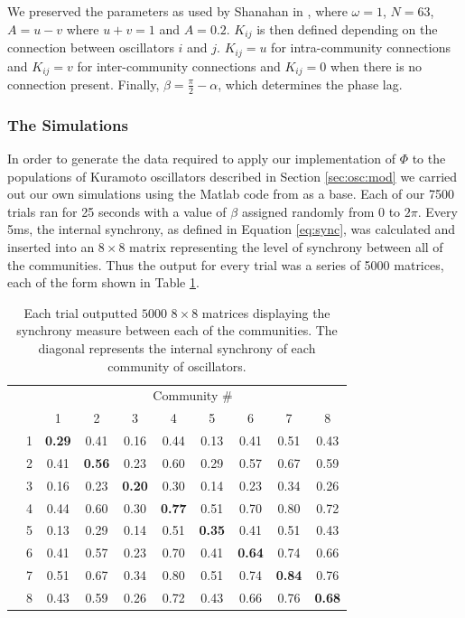 \documentclass[a4paper,11pt]{article}
\begin{document}
We preserved the parameters as used by Shanahan in \cite{Shanahan2010}, where $\omega = 1$, $N = 63$, $A = u - v$ where $u + v = 1$ and $A = 0.2$. $K_{ij}$ is then defined depending on the connection between oscillators $i$ and $j$. $K_{ij} = u$ for intra-community connections and $K_{ij} = v$ for inter-community connections and $K_{ij} = 0$ when there is no connection present. Finally, $\beta = \frac{\pi}{2} - \alpha$, which determines the phase lag.

\subsubsection{The Simulations}
\label{sec:osc:sims}

In order to generate the data required to apply our implementation of $\Phi$ to the populations of Kuramoto oscillators described in Section \ref{sec:osc:mod} we carried out our own simulations using the Matlab code from \cite{Shanahan2010} as a base. Each of our 7500 trials ran for 25 seconds with a value of $\beta$ assigned randomly from $0$ to $2\pi$. Every 5ms, the internal synchrony, as defined in Equation \ref{eq:sync}, was calculated and inserted into an $8 \times 8$ matrix representing the level of synchrony between all of the communities. Thus the output for every trial was a series of 5000 matrices, each of the form shown in Table \ref{tab:mat}.


\begin{table}[ht]
\centering

\begin{tabular}{c l | c c c c c c c c}

& & \multicolumn{8}{c}{Community \#} \\ [2mm]
& & 1 & 2 & 3 & 4 & 5 & 6 & 7 & 8 \\
\hline
\parbox[t]{2mm}{}
& 1 & \textbf{0.29} & 0.41 & 0.16 & 0.44 & 0.13 & 0.41 & 0.51 & 0.43 \\
& 2 & 0.41 & \textbf{0.56} & 0.23 & 0.60 & 0.29 & 0.57 & 0.67 & 0.59 \\
& 3 & 0.16 & 0.23 & \textbf{0.20} & 0.30 & 0.14 & 0.23 & 0.34 & 0.26 \\
& 4 & 0.44 & 0.60 & 0.30 & \textbf{0.77} & 0.51 & 0.70 & 0.80 & 0.72 \\
& 5 & 0.13 & 0.29 & 0.14 & 0.51 & \textbf{0.35} & 0.41 & 0.51 & 0.43 \\
& 6 & 0.41 & 0.57 & 0.23 & 0.70 & 0.41 & \textbf{0.64} & 0.74 & 0.66 \\
& 7 & 0.51 & 0.67 & 0.34 & 0.80 & 0.51 & 0.74 & \textbf{0.84} & 0.76 \\
& 8 & 0.43 & 0.59 & 0.26 & 0.72 & 0.43 & 0.66 & 0.76 & \textbf{0.68} \\
\end{tabular}
\caption{Each trial outputted $5000$ $8 \times 8$ matrices displaying the synchrony measure between each of the communities. The diagonal represents the internal synchrony of each community of oscillators. \label{tab:mat}}
\end{table}
\end{document}
